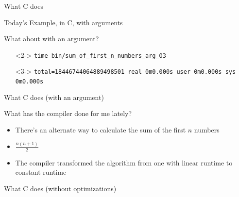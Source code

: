\documentclass[12pt, aspectration=169]{beamer}
\begin{document}
    \begin{frame}{What C does}
        
    \end{frame}

    \begin{frame}{Today's Example, in C, with arguments}
        
    \end{frame}

    \begin{frame}{What about with an argument?}
        \begin{itemize}
            \item[]<2-> \texttt{time bin/sum\_of\_first\_n\_numbers\_arg\_O3\newline}
            \item[]<3-> \texttt{total=18446744064889498501\newline
            real 0m0.000s\newline
            user 0m0.000s\newline
            sys 0m0.000s\newline}
        \end{itemize}
    \end{frame}

    \begin{frame}{What C does (with an argument)}
        
    \end{frame}

    \begin{frame}{What has the compiler done for me lately?}
        \begin{itemize}
            \item There's an alternate way to calculate the sum of the first $n$ numbers
            \item $\frac{n(n + 1)}{2}$
            \item The compiler transformed the algorithm from one with linear runtime to constant runtime
        \end{itemize}
    \end{frame}

    \begin{frame}{What C does (without optimizations)}
        
    \end{frame}
\end{document}
